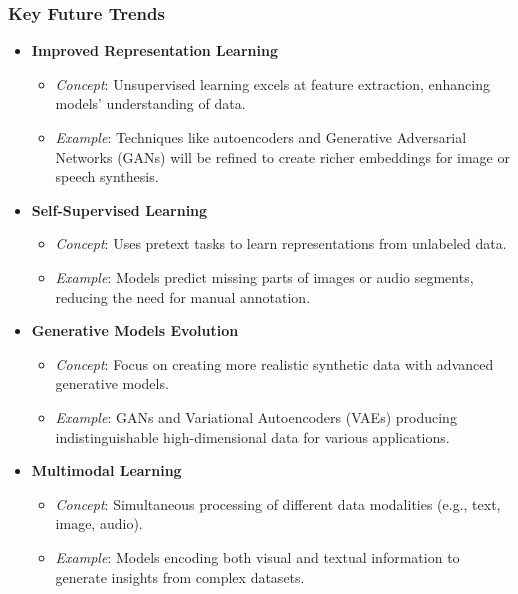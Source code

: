 \documentclass[aspectratio=169]{beamer}
\begin{document}
\begin{frame}[fragile]
    \frametitle{Key Future Trends}
    \begin{itemize}
        \item \textbf{Improved Representation Learning}
            \begin{itemize}
                \item \textit{Concept}: Unsupervised learning excels at feature extraction, enhancing models' understanding of data.
                \item \textit{Example}: Techniques like autoencoders and Generative Adversarial Networks (GANs) will be refined to create richer embeddings for image or speech synthesis.
            \end{itemize}
        \item \textbf{Self-Supervised Learning}
            \begin{itemize}
                \item \textit{Concept}: Uses pretext tasks to learn representations from unlabeled data.
                \item \textit{Example}: Models predict missing parts of images or audio segments, reducing the need for manual annotation.
            \end{itemize}
        \item \textbf{Generative Models Evolution}
            \begin{itemize}
                \item \textit{Concept}: Focus on creating more realistic synthetic data with advanced generative models.
                \item \textit{Example}: GANs and Variational Autoencoders (VAEs) producing indistinguishable high-dimensional data for various applications.
            \end{itemize}
        \item \textbf{Multimodal Learning}
            \begin{itemize}
                \item \textit{Concept}: Simultaneous processing of different data modalities (e.g., text, image, audio).
                \item \textit{Example}: Models encoding both visual and textual information to generate insights from complex datasets.
            \end{itemize}
    \end{itemize}
\end{frame}
\end{document}
